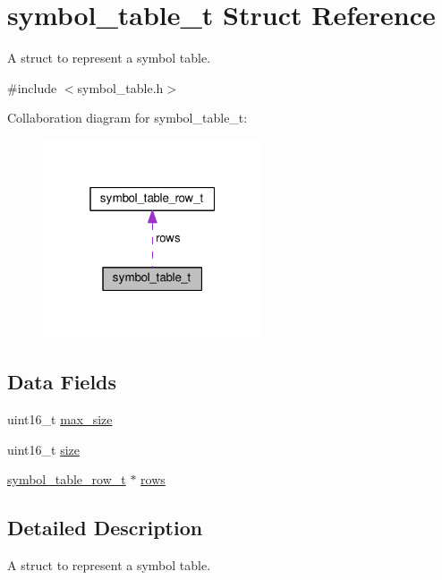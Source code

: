 \hypertarget{structsymbol__table__t}{}\section{symbol\+\_\+table\+\_\+t Struct Reference}
\label{structsymbol__table__t}


A struct to represent a symbol table.  




{\ttfamily \#include $<$symbol\+\_\+table.\+h$>$}



Collaboration diagram for symbol\+\_\+table\+\_\+t\+:\nopagebreak
\begin{figure}[H]
\begin{center}
\leavevmode
\includegraphics[width=184pt]{structsymbol__table__t__coll__graph}
\end{center}
\end{figure}
\subsection*{Data Fields}
\begin{DoxyCompactItemize}
\item 
uint16\+\_\+t \hyperlink{structsymbol__table__t_ab237aa4717eabb6db3618c1626cf4286}{max\+\_\+size}
\item 
uint16\+\_\+t \hyperlink{structsymbol__table__t_a2e4ac803ab5c1afc3a1042e46b08a508}{size}
\item 
\hyperlink{structsymbol__table__row__t}{symbol\+\_\+table\+\_\+row\+\_\+t} $\ast$ \hyperlink{structsymbol__table__t_a6e9f4ff5f1fea234f178daa5f1e120e3}{rows}
\end{DoxyCompactItemize}


\subsection{Detailed Description}
A struct to represent a symbol table. 

